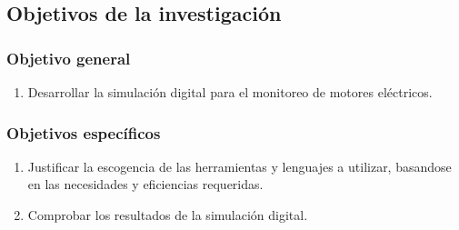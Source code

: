 \subsection{Objetivos de la investigación}

\subsubsection{Objetivo general}
	\begin{enumerate}
		\item  Desarrollar la simulación digital para el monitoreo de motores eléctricos.
	\end{enumerate}
	
\subsubsection{Objetivos específicos}

	\begin{enumerate}
		\item Justificar la escogencia de las herramientas y lenguajes a utilizar, basandose en las necesidades y eficiencias requeridas.

		\item Comprobar los resultados de la simulación digital.
	\end{enumerate}